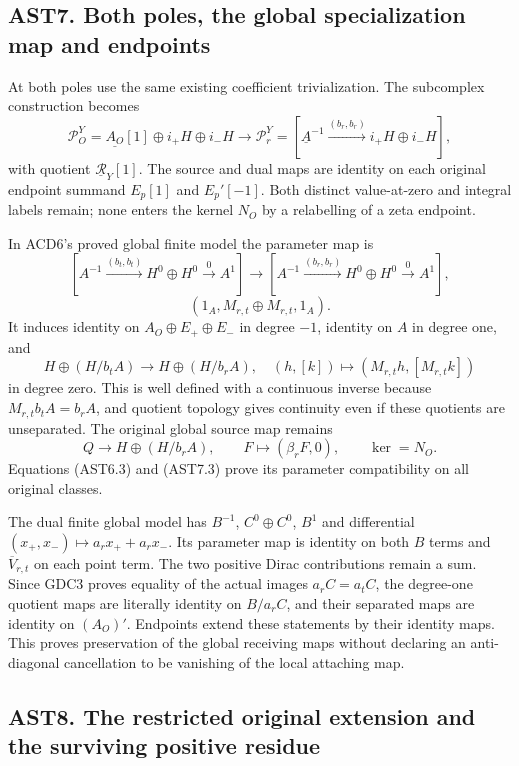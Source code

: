 \subsection{AST7. Both poles, the global specialization map and
endpoints}\label{ast7.-both-poles-the-global-specialization-map-and-endpoints}

At both poles use the same existing coefficient trivialization. The
subcomplex construction becomes \[
\mathscr P_O^Y=\underline{A_O}[1]\oplus i_+H\oplus i_-H
\longrightarrow
\mathscr P_r^Y=[\underline A^{-1}\xrightarrow{(b_r,b_r)}i_+H\oplus i_-H],
\tag{AST7.1}
\] with quotient \(\underline{\mathcal R}_Y[1]\). The source and dual
maps are identity on each original endpoint summand \(E_p[1]\) and
\(E_p'[-1]\). Both distinct value-at-zero and integral labels remain;
none enters the kernel \(N_O\) by a relabelling of a zeta endpoint.

In ACD6's proved global finite model the parameter map is \[
[A^{-1}\xrightarrow{(b_t,b_t)}H^0\oplus H^0\xrightarrow0A^1]
\longrightarrow
[A^{-1}\xrightarrow{(b_r,b_r)}H^0\oplus H^0\xrightarrow0A^1],
\] \[
(1_A,M_{r,t}\oplus M_{r,t},1_A).
\tag{AST7.2}
\] It induces identity on \(A_O\oplus E_+\oplus E_-\) in degree \(-1\),
identity on \(A\) in degree one, and \[
H\oplus(H/b_tA)\longrightarrow H\oplus(H/b_rA),
\quad(h,[k])\longmapsto(M_{r,t}h,[M_{r,t}k])
\tag{AST7.3}
\] in degree zero. This is well defined with a continuous inverse
because \(M_{r,t}b_tA=b_rA\), and quotient topology gives continuity
even if these quotients are unseparated. The original global source map
remains \[
Q\longrightarrow H\oplus(H/b_rA),\qquad
F\longmapsto(\beta_rF,0),\qquad \ker=N_O.
\tag{AST7.4}
\] Equations (AST6.3) and (AST7.3) prove its parameter compatibility on
all original classes.

The dual finite global model has \(B^{-1}\), \(C^0\oplus C^0\), \(B^1\)
and differential \((x_+,x_-)\mapsto a_rx_++a_rx_-\). Its parameter map
is identity on both \(B\) terms and \(\overline V_{r,t}\) on each point
term. The two positive Dirac contributions remain a sum. Since GDC3
proves equality of the actual images \(a_rC=a_tC\), the degree-one
quotient maps are literally identity on \(B/a_rC\), and their separated
maps are identity on \((A_O)'\). Endpoints extend these statements by
their identity maps. This proves preservation of the global receiving
maps without declaring an anti-diagonal cancellation to be vanishing of
the local attaching map.

\subsection{AST8. The restricted original extension and the surviving
positive
residue}\label{ast8.-the-restricted-original-extension-and-the-surviving-positive-residue}

